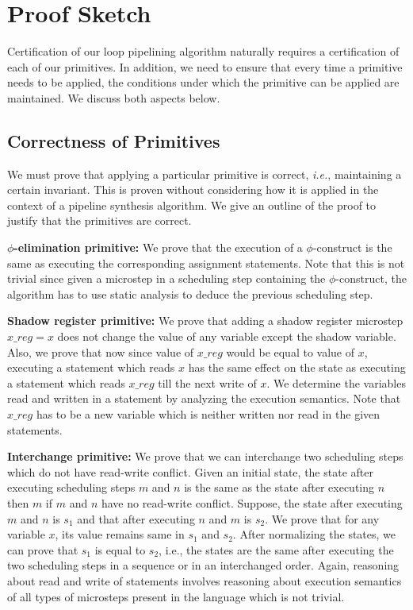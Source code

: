 \chapter{Proof Sketch}
\label{sec:proof}

Certification of our loop pipelining algorithm naturally requires a certification of each of our primitives.
In addition, we need to ensure that every time a primitive needs to be applied, the conditions
under which the primitive can be applied are maintained. We discuss both aspects below.

\section{Correctness of Primitives}
We must prove that applying a particular primitive is correct, {\em i.e.},
maintaining a certain invariant.  This is proven without
considering how it is applied in the context of a pipeline
synthesis algorithm. We give an outline of the proof to justify that the primitives are correct.

{\bf $\phi$-elimination primitive:} We prove that the execution
  of a $\phi$-construct is the same as executing the corresponding
  assignment statements. Note that this is not trivial since
  given a microstep in a scheduling step containing the
  $\phi$-construct, the algorithm has to use static analysis
  to deduce the previous scheduling step.

{\bf Shadow register primitive:} We prove that adding
  a shadow register microstep $x\_reg = x$ does not change the
  value of any variable except the shadow variable. Also, we
  prove that now since value of $x\_reg$ would be equal to value
  of $x$, executing a statement which reads $x$ has the same
  effect on the state as executing a statement which reads
  $x\_reg$ till the next write of $x$. We
  determine the variables read and written in a statement by
  analyzing the execution semantics. Note that $x\_reg$ has to be a new variable which
  is neither written nor read in the given statements.

{\bf Interchange primitive:} We prove that we can interchange two scheduling steps which do not have
  read-write conflict. Given an initial state, the state after
  executing scheduling steps $m$ and $n$ is the same as the state after
  executing $n$ then $m$ if $m$ and $n$ have no read-write
  conflict. Suppose, the state after
  executing $m$ and $n$ is $s_1$ and that after executing $n$ and
  $m$ is $s_2$. We prove that for any variable $x$, its
  value remains same in $s_1$ and $s_2$. After normalizing
  the states, we can prove that $s_1$ is equal to $s_2$, i.e.,
  the states are the same after executing the two scheduling steps in
  a sequence or in an interchanged order. Again, reasoning about read and
  write of statements involves reasoning about execution
  semantics of all types of microsteps present in the
  language which is not trivial.

